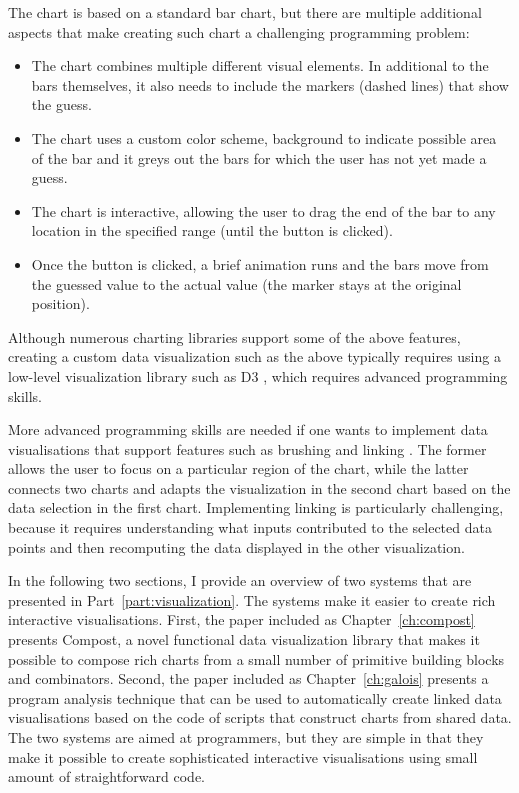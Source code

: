 \documentclass[fleqn,11pt]{report}
\theoremstyle{definition}
\newenvironment{nitemize}
{ \vspace{-0.4em}
  \begin{itemize}
    \setlength{\itemsep}{5pt}
    \setlength{\parskip}{0pt}
    \setlength{\parsep}{0pt} }
{ \end{itemize}
  \vspace{-0.4em} }
\begin{document}
The chart is based on a standard bar chart, but there are multiple additional aspects that
make creating such chart a challenging programming problem:

\begin{nitemize}
\item The chart combines multiple different visual elements. In additional to the bars themselves,
  it also needs to include the markers (dashed lines) that show the guess.
\item The chart uses a custom color scheme, background to indicate possible area of the bar and it
  greys out the bars for which the user has not yet made a guess.
\item The chart is interactive, allowing the user to drag the end of the bar to any location in
  the specified range (until the button is clicked).
\item Once the button is clicked, a brief animation runs and the bars move from the guessed
  value to the actual value (the marker stays at the original position).
\end{nitemize}

Although numerous charting libraries support some of the above features, creating a custom
data visualization such as the above typically requires using a low-level visualization library
such as D3 \citep{bostock-2011-d3}, which requires advanced programming skills.

More advanced programming skills are needed if one wants to implement data visualisations
that support features such as brushing and linking \citep{buja-1991-linking}. The former allows
the user to focus on a particular region of the chart, while the latter connects two charts and
adapts the visualization in the second chart based on the data selection in the first chart.
Implementing linking is particularly challenging, because it requires understanding what
inputs contributed to the selected data points and then recomputing the data displayed in the
other visualization.

In the following two sections, I provide an overview of two systems that are presented in
Part~\ref{part:visualization}. The systems make it easier to create rich interactive
visualisations. First, the paper included as Chapter~\ref{ch:compost} presents Compost, a novel
functional data visualization library that makes it possible to compose rich charts
from a small number of primitive building blocks and combinators.
Second, the paper included as Chapter~\ref{ch:galois}
presents a program analysis technique that can be used to automatically create linked data
visualisations based on the code of scripts that construct charts from shared data.
The two systems are aimed at programmers, but they are simple in that they make it possible
to create sophisticated interactive visualisations using small amount of straightforward code.
\end{document}
